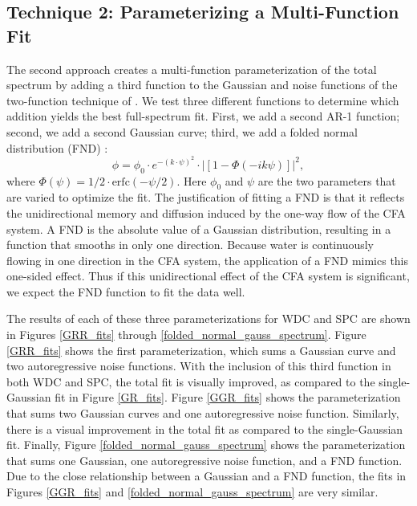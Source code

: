 \documentclass[draft, jgrga]{AGUTeX}
\begin{document}
\begin{article}
\subsection{Technique 2: Parameterizing a Multi-Function Fit}
The second approach creates a multi-function parameterization of the total spectrum by adding a third function to the Gaussian and noise functions of the two-function technique of \citet{Gkinis2014}. We test three different functions to determine which addition yields the best full-spectrum fit. First, we add a second AR-1 function; second, we add a second Gaussian curve; third, we add a folded normal distribution (FND) \citep{Tsagris2014}:
\begin{equation}
\phi = \phi_{0} \cdot e^{-(k \cdot \psi)^2} \cdot |\left[1 - \Phi(-i k \psi)\right]|^2,
\end{equation}
where $\Phi(\psi) = 1/2\cdot \mathrm{erfc}(-\psi/2) $. Here $\phi_0$ and $\psi$ are the two parameters that are varied to optimize the fit. The justification of fitting a FND is that it reflects the unidirectional memory and diffusion induced by the one-way flow of the CFA system. A FND is the absolute value of a Gaussian distribution, resulting in a function that smooths in only one direction. Because water is continuously flowing in one direction in the CFA system, the application of a FND mimics this one-sided effect. Thus if this unidirectional effect of the CFA system is significant, we expect the FND function to fit the data well.

The results of each of these three parameterizations for WDC and SPC are shown in Figures \ref{GRR_fits} through \ref{folded_normal_gauss_spectrum}. Figure \ref{GRR_fits} shows the first parameterization, which sums a Gaussian curve and two autoregressive noise functions. With the inclusion of this third function in both WDC and SPC, the total fit is visually improved, as compared to the single-Gaussian fit in Figure \ref{GR_fits}. Figure \ref{GGR_fits} shows the parameterization that sums two Gaussian curves and one autoregressive noise function. Similarly, there is a visual improvement in the total fit as compared to the single-Gaussian fit. Finally, Figure \ref{folded_normal_gauss_spectrum} shows the parameterization that sums one Gaussian, one autoregressive noise function, and a FND function. Due to the close relationship between a Gaussian and a FND function, the fits in Figures \ref{GGR_fits} and \ref{folded_normal_gauss_spectrum} are very similar.



\end{article}
\end{document}
